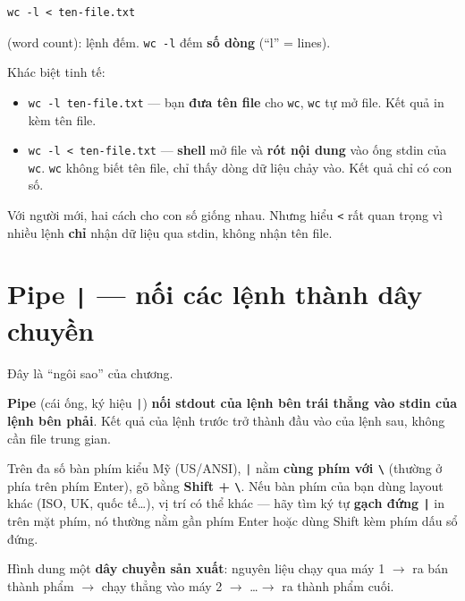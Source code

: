 \documentclass[12pt,a4paper]{article}
\newcommand{\cmd}[1]{\texttt{#1}}
\begin{document}
\begin{Verbatim}
wc -l < ten-file.txt
\end{Verbatim}

\begin{notebox}[title={Định nghĩa nhanh --- \texttt{wc}}]
(word count): lệnh đếm. \cmd{wc -l} đếm \textbf{số dòng} (``l'' = lines).
\end{notebox}

Khác biệt tinh tế:

\begin{itemize}[leftmargin=1.4em]
\item \cmd{wc -l ten-file.txt} --- bạn \textbf{đưa tên file} cho \cmd{wc}, \cmd{wc} tự mở file. Kết quả in kèm tên file.
\item \cmd{wc -l < ten-file.txt} --- \textbf{shell} mở file và \textbf{rót nội dung} vào ống stdin của \cmd{wc}. \cmd{wc} không biết tên file, chỉ thấy dòng dữ liệu chảy vào. Kết quả chỉ có con số.
\end{itemize}

Với người mới, hai cách cho con số giống nhau. Nhưng hiểu \cmd{<} rất quan trọng vì nhiều lệnh \textbf{chỉ} nhận dữ liệu qua stdin, không nhận tên file.

\section{Pipe \texttt{|} --- nối các lệnh thành dây chuyền}

Đây là ``ngôi sao'' của chương.

\textbf{Pipe} (cái ống, ký hiệu \cmd{|}) \textbf{nối stdout của lệnh bên trái thẳng vào stdin của lệnh bên phải}. Kết quả của lệnh trước trở thành đầu vào của lệnh sau, không cần file trung gian.

\begin{notebox}[title={Tìm phím \texttt{|} ở đâu?}]
Trên đa số bàn phím kiểu Mỹ (US/ANSI), \cmd{|} nằm \textbf{cùng phím với \cmd{\textbackslash{}}} (thường ở phía trên phím Enter), gõ bằng \textbf{Shift + \cmd{\textbackslash{}}}. Nếu bàn phím của bạn dùng layout khác (ISO, UK, quốc tế\ldots), vị trí có thể khác --- hãy tìm ký tự \textbf{gạch đứng \cmd{|}} in trên mặt phím, nó thường nằm gần phím Enter hoặc dùng Shift kèm phím dấu sổ đứng.
\end{notebox}

Hình dung một \textbf{dây chuyền sản xuất}: nguyên liệu chạy qua máy 1 $\rightarrow$ ra bán thành phẩm $\rightarrow$ chạy thẳng vào máy 2 $\rightarrow$ \ldots $\rightarrow$ ra thành phẩm cuối.
\end{document}
